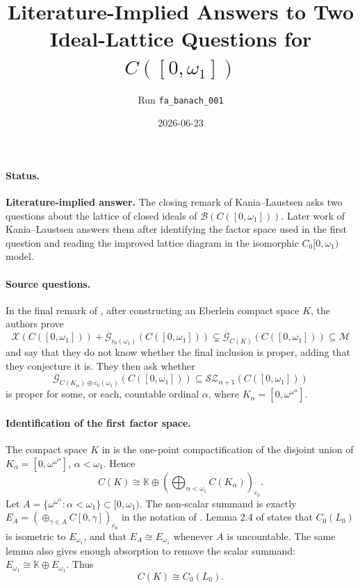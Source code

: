 \documentclass[11pt]{article}
\title{Literature-Implied Answers to Two Ideal-Lattice Questions for \(C([0,\omega_1])\)}
\author{Run \texttt{fa\_banach\_001}}
\date{2026-06-23}
\newcommand{\om}{\omega}
\newcommand{\cG}{\mathscr G}
\newcommand{\cM}{\mathscr M}
\newcommand{\cX}{\mathscr X}
\newcommand{\Sz}{\mathscr{S\!Z}}
\begin{document}
\sloppy
\maketitle

\paragraph{Status.}
\textbf{Literature-implied answer.} The closing remark of Kania--Laustsen
\cite{KL2011} asks two questions about the lattice of closed ideals of
\(\mathscr B(C([0,\om_1]))\). Later work of Kania--Laustsen \cite{KL2014}
answers them after identifying the factor space used in the first question
and reading the improved lattice diagram in the isomorphic
\(C_0[0,\om_1)\) model.

\paragraph{Source questions.}
In the final remark of \cite{KL2011}, after constructing an Eberlein compact
space \(K\), the authors prove
\[
 \cX(C([0,\om_1]))+\overline{\cG}_{c_0(\om_1)}(C([0,\om_1]))
 \subsetneq
 \overline{\cG}_{C(K)}(C([0,\om_1]))
 \subseteq
 \cM
\]
and say that they do not know whether the final inclusion is proper, adding
that they conjecture it is. They then ask whether
\[
 \overline{\cG}_{C(K_\alpha)\oplus c_0(\om_1)}(C([0,\om_1]))
 \subseteq
 \Sz_{\alpha+1}(C([0,\om_1]))
\]
is proper for some, or each, countable ordinal \(\alpha\), where
\(K_\alpha=[0,\om^{\om^\alpha}]\).

\paragraph{Identification of the first factor space.}
The compact space \(K\) in \cite{KL2011} is the one-point compactification of
the disjoint union of \(K_\alpha=[0,\om^{\om^\alpha}]\),
\(\alpha<\om_1\). Hence
\[
 C(K)\cong
 \mathbb K\oplus
 \left(\bigoplus_{\alpha<\om_1} C(K_\alpha)\right)_{c_0}.
\]
Let \(A=\{\om^{\om^\alpha}:\alpha<\om_1\}\subset[0,\om_1)\). The non-scalar
summand is exactly \(E_A=(\oplus_{\gamma\in A} C[0,\gamma])_{c_0}\) in the
notation of \cite{KL2014}. Lemma 2.4 of \cite{KL2014} states that
\(C_0(L_0)\) is isometric to \(E_{\om_1}\), and that \(E_A\cong E_{\om_1}\)
whenever \(A\) is uncountable. The same lemma also gives enough absorption
to remove the scalar summand: \(E_{\om_1}\cong \mathbb K\oplus E_{\om_1}\).
Thus
\[
 C(K)\cong C_0(L_0).
\]
\end{document}
